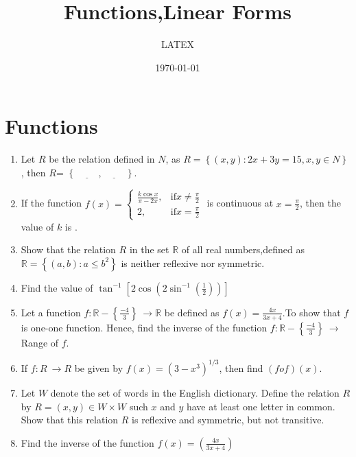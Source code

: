 \documentclass[12pt,-letter paper]{article}
\title{Functions,Linear Forms}
\date{\today}
\providecommand{\cbrak}[1]{\ensuremath{\left\{#1\right\}}}
\providecommand{\sbrak}[1]{\ensuremath{{}\left[#1\right]}}
\providecommand{\brak}[1]{\ensuremath{\left(#1\right)}}
\begin{document}
\author{LATEX}
\maketitle

\section*{Functions}
\begin{enumerate}
\item Let $R$ be the relation defined in $N$, as
$R = \cbrak{(x, y) : 2x + 3y = 15, x, y \in N}$, then $R$=  \cbrak{\underline{\hspace{1cm}},\underline{\hspace{1cm}}}.
\item If the function $f(x)=\begin{cases}\frac{k\cos{x}}{\pi - 2x}, & \text{if} x \neq \frac{\pi}{2}\\\text{2},&\text{if} x=\frac{\pi}{2}\end{cases}$  is continuous  at $x=\frac{\pi}{2}$, then the value of $k$ is {\underline{\hspace{1cm}}}.
\item Show that the relation $R$ in the set $\mathbb{R}$ of all real numbers,defined as $\mathbb{R}=\cbrak{(a, b) : a \leq b^2}$ is neither reflexive nor symmetric.
\item Find the value of $\tan^{-1}\sbrak{{2\cos}\brak{2 \sin^{-1}\brak{\frac{1}{2}}}}$
\item Let a function $f:\mathbb{R}-\cbrak{\frac{-4}{3}}\ \to \mathbb{R}$ be defined as $f(x)=\frac{4x}{3x+4}$.To show that $f$ is one-one function. Hence, find the inverse of the function $f:\mathbb{R}-\cbrak{\frac{-4}{3}} \ \to$ Range\hspace{0.25em} of $f$.
\item If $f:R\ \to R$ be given by $f(x)=\brak{3-x^3}^{1/3}$, then find $\brak{fof}\brak{x}$.
\item Let $W$ denote the set of words in the English dictionary. Define the relation $R$ by
$R={\brak{x,y}}\in W \times W$  such $x$ and $y$ have at least one letter in common. Show that this relation $R$ is reflexive and symmetric, but not transitive.
\item Find the inverse of the function $f(x)=\brak{\frac{4x}{3x+4}}$


\end{enumerate}
\end{document}
